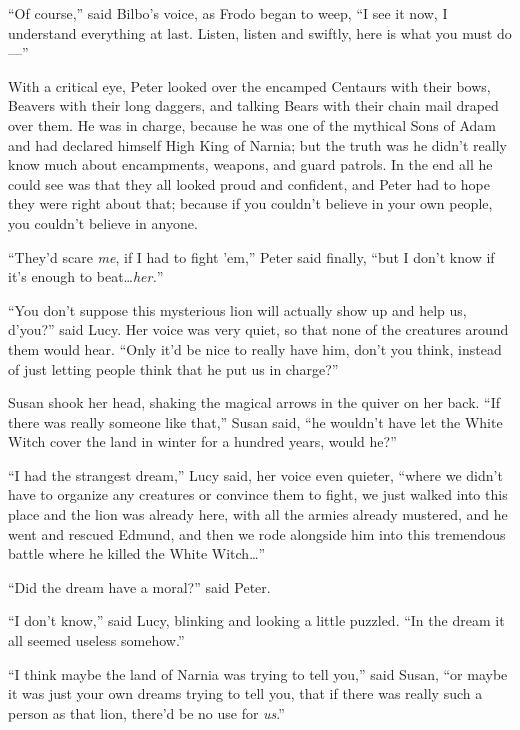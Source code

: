 “Of course,” said Bilbo’s voice, as Frodo began to weep, “I see it now, I understand everything at last. Listen, listen and swiftly, here is what you must do—”


With a critical eye, Peter looked over the encamped Centaurs with their bows, Beavers with their long daggers, and talking Bears with their chain mail draped over them. He was in charge, because he was one of the mythical Sons of Adam and had declared himself High King of Narnia; but the truth was he didn’t really know much about encampments, weapons, and guard patrols. In the end all he could see was that they all looked proud and confident, and Peter had to hope they were right about that; because if you couldn’t believe in your own people, you couldn’t believe in anyone.

“They’d scare \emph{me}, if I had to fight ’em,” Peter said finally, “but I don’t know if it’s enough to beat…\emph{her.}”

“You don’t suppose this mysterious lion will actually show up and help us, d’you?” said Lucy. Her voice was very quiet, so that none of the creatures around them would hear. “Only it’d be nice to really have him, don’t you think, instead of just letting people think that he put us in charge?”

Susan shook her head, shaking the magical arrows in the quiver on her back. “If there was really someone like that,” Susan said, “he wouldn’t have let the White Witch cover the land in winter for a hundred years, would he?”

“I had the strangest dream,” Lucy said, her voice even quieter, “where we didn’t have to organize any creatures or convince them to fight, we just walked into this place and the lion was already here, with all the armies already mustered, and he went and rescued Edmund, and then we rode alongside him into this tremendous battle where he killed the White Witch…”

“Did the dream have a moral?” said Peter.

“I don’t know,” said Lucy, blinking and looking a little puzzled. “In the dream it all seemed useless somehow.”

“I think maybe the land of Narnia was trying to tell you,” said Susan, “or maybe it was just your own dreams trying to tell you, that if there was really such a person as that lion, there’d be no use for \emph{us}.”

